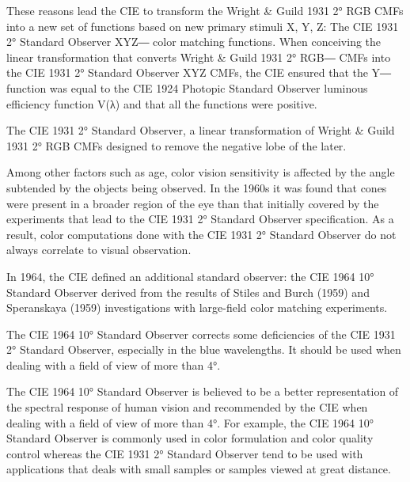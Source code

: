 These reasons lead the CIE to transform the Wright & Guild 1931 2° RGB CMFs into a new set of functions based on new primary stimuli X, Y, Z: The CIE 1931 2° Standard Observer XYZ― color matching functions. When conceiving the linear transformation that converts Wright & Guild 1931 2° RGB― CMFs into the CIE 1931 2° Standard Observer XYZ CMFs, the CIE ensured that the Y― function was equal to the CIE 1924 Photopic Standard Observer luminous efficiency function V(λ) and that all the functions were positive.


The CIE 1931 2° Standard Observer, a linear transformation of Wright & Guild 1931 2° RGB CMFs designed to remove the negative lobe of the later.

Among other factors such as age, color vision sensitivity is affected by the angle subtended by the objects being observed. In the 1960s it was found that cones were present in a broader region of the eye than that initially covered by the experiments that lead to the CIE 1931 2° Standard Observer specification. As a result, color computations done with the CIE 1931 2° Standard Observer do not always correlate to visual observation.

In 1964, the CIE defined an additional standard observer: the CIE 1964 10° Standard Observer derived from the results of Stiles and Burch (1959) and Speranskaya (1959) investigations with large-field color matching experiments.


The CIE 1964 10° Standard Observer corrects some deficiencies of the CIE 1931 2° Standard Observer, especially in the blue wavelengths. It should be used when dealing with a field of view of more than 4°.

The CIE 1964 10° Standard Observer is believed to be a better representation of the spectral response of human vision and recommended by the CIE when dealing with a field of view of more than 4°. For example, the CIE 1964 10° Standard Observer is commonly used in color formulation and color quality control whereas the CIE 1931 2° Standard Observer tend to be used with applications that deals with small samples or samples viewed at great distance.

